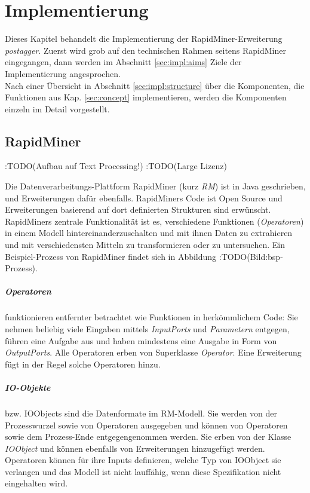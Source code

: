 %
\chapter{Implementierung}
\label{sec:impl}

Dieses Kapitel behandelt die Implementierung der RapidMiner-Erweiterung \textit{postagger}. Zuerst wird grob auf den technischen Rahmen seitens RapidMiner eingegangen, dann werden im Abschnitt \ref{sec:impl:aims} Ziele der Implementierung angesprochen. \\
Nach einer Übersicht in Abschnitt \ref{sec:impl:structure} über die Komponenten, die Funktionen aus Kap. \ref{sec:concept} implementieren, werden die Komponenten einzeln im Detail vorgestellt.

\section{RapidMiner}
\label{sec:impl:rm}
:TODO(Aufbau auf Text Processing!)
:TODO(Large Lizenz)

Die Datenverarbeitungs-Plattform RapidMiner (kurz \textit{RM}) ist in Java geschrieben, und Erweiterungen dafür ebenfalls. RapidMiners Code ist Open Source und Erweiterungen basierend auf dort definierten Strukturen sind erwünscht. RapidMiners zentrale Funktionalität ist es, verschiedene Funktionen (\textit{Operatoren}) in einem Modell hintereinanderzuschalten und mit ihnen Daten zu extrahieren und mit verschiedensten Mitteln zu transformieren oder zu untersuchen. Ein Beispiel-Prozess von RapidMiner findet sich in Abbildung :TODO(Bild:bsp-Prozess).

\paragraph{Operatoren} 
funktionieren entfernter betrachtet wie Funktionen in herkömmlichem Code: Sie nehmen beliebig viele Eingaben mittels \textit{InputPorts} und \textit{Parametern} entgegen, führen eine Aufgabe aus und haben mindestens eine Ausgabe in Form von \textit{OutputPorts}. Alle Operatoren erben von Superklasse \textit{Operator}. Eine Erweiterung fügt in der Regel solche Operatoren hinzu.
\paragraph{IO-Objekte}
bzw. IOObjects sind die Datenformate im RM-Modell. Sie werden von der Prozesswurzel sowie von Operatoren ausgegeben und können von Operatoren sowie dem Prozess-Ende entgegengenommen werden. Sie erben von der Klasse \textit{IOObject} und können ebenfalls von Erweiterungen hinzugefügt werden. Operatoren können für ihre Inputs definieren, welche Typ von IOObject sie verlangen und das Modell ist nicht lauffähig, wenn diese Spezifikation nicht eingehalten wird.

